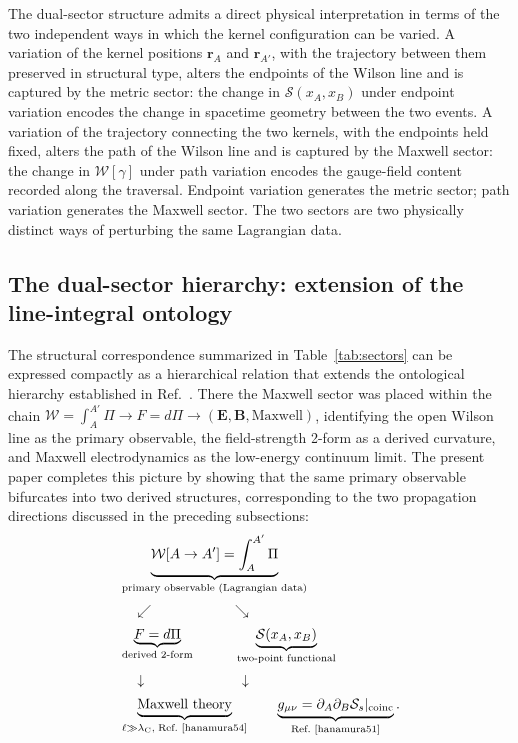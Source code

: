 \documentclass[%
 reprint, amsmath,amssymb, aps, prb, ]{revtex4-2}
\numberwithin{equation}{section}
\newcommand{\WL}{\mathcal{W}}
\newcommand{\lambdaC}{\lambda_{\mathrm{C}}}
\begin{document}
The dual-sector structure admits a direct physical interpretation in terms of the two independent ways in which the kernel configuration can be varied. A variation of the kernel positions $\mathbf{r}_A$ and $\mathbf{r}_{A'}$, with the trajectory between them preserved in structural type, alters the endpoints of the Wilson line and is captured by the metric sector: the change in $\mathcal{S}(x_A, x_B)$ under endpoint variation encodes the change in spacetime geometry between the two events. A variation of the trajectory connecting the two kernels, with the endpoints held fixed, alters the path of the Wilson line and is captured by the Maxwell sector: the change in $\WL[\gamma]$ under path variation encodes the gauge-field content recorded along the traversal. Endpoint variation generates the metric sector; path variation generates the Maxwell sector. The two sectors are two physically distinct ways of perturbing the same Lagrangian data.

\subsection{The dual-sector hierarchy: extension of the line-integral ontology}
\label{sec:hierarchy_extension}

The structural correspondence summarized in Table~\ref{tab:sectors} can be expressed compactly as a hierarchical relation that extends the ontological hierarchy established in Ref.~\cite{hanamura54}. There the Maxwell sector was placed within the chain $\WL = \int_A^{A'}\Pi \to F = d\Pi \to (\mathbf{E},\mathbf{B},\text{Maxwell})$, identifying the open Wilson line as the primary observable, the field-strength 2-form as a derived curvature, and Maxwell electrodynamics as the low-energy continuum limit. The present paper completes this picture by showing that the same primary observable bifurcates into two derived structures, corresponding to the two propagation directions discussed in the preceding subsections:
\begin{align}
&\underbrace{\WL[A\to A'] = \int_A^{A'}\Pi}_{\text{primary observable (Lagrangian data)}}
\notag\\[0.2em]
&\quad\swarrow\qquad\qquad\qquad\searrow\notag\\[0.2em]
&\underbrace{F = d\Pi}_{\text{derived 2-form}}
\qquad\quad
\underbrace{\mathcal{S}(x_A,x_B)}_{\text{two-point functional}}
\notag\\[0.2em]
&\quad\downarrow\qquad\qquad\qquad\quad\downarrow\notag\\[0.2em]
&\underbrace{\text{Maxwell theory}}_{\ell\gg\lambdaC,\;\text{Ref.~\cite{hanamura54}}}
\qquad
\underbrace{g_{\mu\nu} = \partial_{A}\partial_{B}\mathcal{S}_s|_{\text{coinc}}}_{\text{Ref.~\cite{hanamura51}}}.
\label{eq:hierarchy_55}
\end{align}
\end{document}
